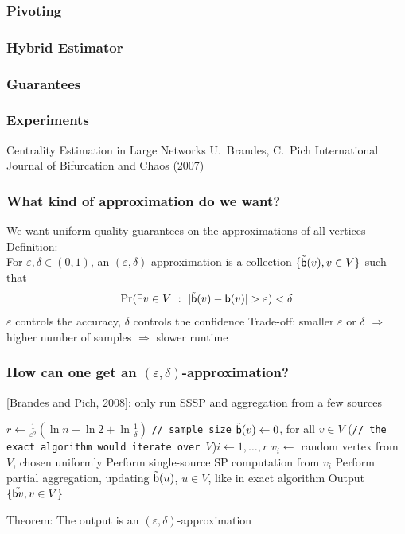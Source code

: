 \begin{frame}
  \frametitle{Pivoting}
\end{frame}

\begin{frame}
  \frametitle{Hybrid Estimator}
\end{frame}

\begin{frame}
  \frametitle{Guarantees}
\end{frame}

\begin{frame}
  \frametitle{Experiments}
\end{frame}


\begin{frame}
  \centering
  \vfill
  {\Huge Centrality Estimation in Large Networks}
  \vfill
  {\Large U.~Brandes, C.~Pich}
  \vfill
  {\large International Journal of Bifurcation and Chaos (2007)}
  \vfill
\end{frame}

\begin{frame}
  \frametitle{What kind of approximation do we want?}
  We want uniform quality guarantees on the approximations of all vertices
  \vfill
  Definition:\\
  \quad For $\varepsilon,\delta\in(0,1)$, an $(\varepsilon,\delta)$-approximation is
  a collection $\{\tilde{\mathsf{b}}(v), v\in V\}$ such that
  \[
    \Pr(\exists v\in V ~:~ |\tilde{\betw}(v) -\betw(v)|>\varepsilon)<\delta
  \]
  $\varepsilon$ controls the accuracy, $\delta$ controls the confidence
  \vfill
  Trade-off: smaller $\varepsilon$ or $\delta$ $\Rightarrow$ higher number of
  samples $\Rightarrow$ slower runtime
\end{frame}

\begin{frame}
  \frametitle{How can one get an $(\varepsilon,\delta)$-approximation?}
  [Brandes and Pich, 2008]: only run SSSP and aggregation from a few sources
  \vfill
  \begin{algorithm}[H]
    \DontPrintSemicolon
    $r\leftarrow \frac{1}{\varepsilon^2}\left(\ln n + \ln 2 +
    \ln\frac{1}{\delta}\right)$ \texttt{// sample size}\;
    $\tilde{\mathsf{b}}(v)\leftarrow 0$, for all $v\in V$\;
    \For(\texttt{// the exact algorithm would iterate over $V$}){$i\leftarrow 1,\dotsc,r$} {
      $v_i \leftarrow$ random vertex from $V$, chosen uniformly\;
      Perform single-source SP computation from $v_i$\;
      Perform partial aggregation, updating $\tilde{\mathsf{b}}(u)$, $u\in V$,
      like in exact algorithm\;
    }
    Output $\{\tilde{\mathsf{b}{v}}, v\in V\}$\;
  \end{algorithm}
  \vfill
  Theorem: The output is an $(\varepsilon,\delta)$-approximation
\end{frame}

